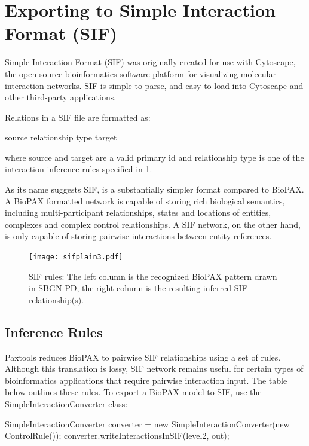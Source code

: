 \documentclass{tufte-book}
\begin{document}
\section{Exporting to Simple Interaction Format (SIF)}
Simple Interaction Format (SIF) was originally created for use with Cytoscape, the open source bioinformatics software platform for visualizing molecular interaction networks. SIF is simple to parse, and easy to load into Cytoscape and other third-party applications. 

Relations in a SIF file are formatted as: 

\begin{xmlcode}
source relationship type target
\end{xmlcode}

where source and target are a valid primary id and relationship type is one of the interaction inference rules specified in \ref{fig:SIF}. 

As its name suggests SIF, is a substantially simpler format compared to BioPAX. A BioPAX formatted network is capable of storing rich biological semantics, including multi-participant relationships, states and locations of entities, complexes and complex control relationships. A SIF network, on the other hand, is only capable of storing pairwise interactions between entity references. 

\begin{figure}[h]
\texttt{[image: sifplain3.pdf]}%
\caption{SIF rules: The left column is the recognized BioPAX pattern drawn in SBGN-PD, the right column is the resulting inferred SIF relationship(s).}
\label{fig:SIF}%
\end{figure}

\subsection{Inference Rules}
Paxtools reduces BioPAX  to pairwise SIF relationships using a set of rules. Although this translation is lossy, SIF network remains useful for certain types of bioinformatics applications that require pairwise interaction input. The table below outlines these rules.
To export a BioPAX model to SIF, use the SimpleInteractionConverter class: 

\begin{javacode}
   SimpleInteractionConverter converter = 
   new SimpleInteractionConverter(new ControlRule());
   converter.writeInteractionsInSIF(level2, out);
\end{javacode}
\end{document}
